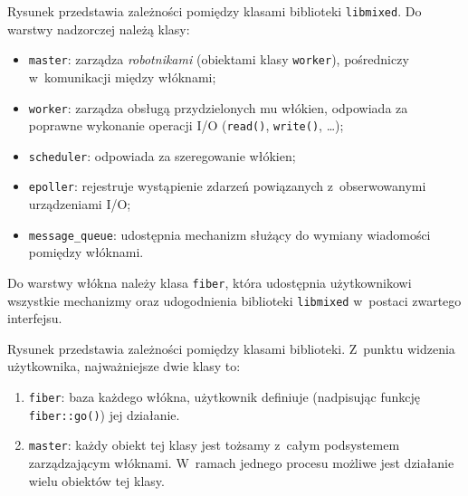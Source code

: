 \documentclass[12pt]{mwart}
\newcommand{\code}{\texttt}
\newcommand{\dcolon}{::}
\newcommand{\procbr}{()}
\newcommand{\function}[1]{\code{#1\procbr}}
\begin{document}
\indent
  Rysunek  przedstawia zależności pomiędzy klasami biblioteki \code{libmixed}.
  Do warstwy nadzorczej należą klasy:
  \begin{itemize}
    \item \code{master}: zarządza \emph{robotnikami} (obiektami klasy \code{worker}), pośredniczy w~komunikacji między włóknami;
    \item \code{worker}: zarządza obsługą przydzielonych mu włókien, odpowiada za poprawne wykonanie operacji I/O (\function{read}, \function{write}, \ldots);
    \item \code{scheduler}: odpowiada za szeregowanie włókien;
    \item \code{epoller}: rejestruje wystąpienie zdarzeń powiązanych z~obserwowanymi urządzeniami I/O;
    \item \code{message\_queue}: udostępnia mechanizm służący do wymiany wiadomości pomiędzy włóknami.
  \end{itemize}
  Do warstwy włókna należy klasa \code{fiber}, która udostępnia użytkownikowi wszystkie mechanizmy oraz udogodnienia biblioteki \code{libmixed} w~postaci
  zwartego interfejsu.
\par
\indent
  Rysunek  przedstawia zależności pomiędzy klasami biblioteki. Z~punktu widzenia użytkownika, najważniejsze dwie klasy to:
  \begin{enumerate}
    \item \code{fiber}: baza każdego włókna, użytkownik definiuje (nadpisując funkcję \function{fiber\dcolon go}) jej działanie.
    \item \code{master}: każdy obiekt tej klasy jest tożsamy z~całym podsystemem zarządzającym włóknami. W~ramach jednego procesu możliwe jest działanie wielu
      obiektów tej klasy.
  \end{enumerate}
\par
%
\newpage
\end{document}
